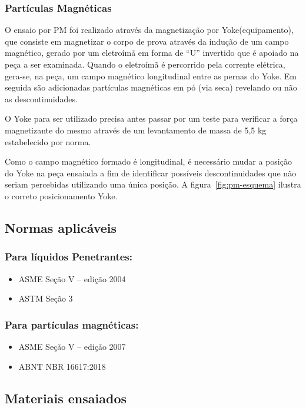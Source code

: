 \documentclass[12pt,oneside]{article}
\begin{document}
\subsubsection{Partículas Magnéticas}
O ensaio por PM foi realizado através da magnetização por Yoke(equipamento), que consiste em magnetizar
o corpo de prova através da indução de um campo magnético, gerado por um eletroímã em forma
de ``U'' invertido que é apoiado na peça a ser examinada. Quando o eletroímã é percorrido
pela corrente elétrica, gera-se, na peça, um campo magnético longitudinal entre as pernas do Yoke.
Em seguida são adicionadas partículas magnéticas em pó (via seca) revelando ou não as descontinuidades.

O Yoke para ser utilizado precisa antes passar por um teste para verificar a força magnetizante do mesmo
através de um levantamento de massa de 5,5 kg estabelecido por norma.

Como o campo magnético formado é longitudinal, é necessário mudar a posição do Yoke na peça
ensaiada a fim de identificar possíveis descontinuidades que não seriam percebidas
utilizando uma única posição. A figura~\ref{fig:pm-esquema} ilustra o correto posicionamento
Yoke.


\subsection{Normas aplicáveis}
\subsubsection{Para líquidos Penetrantes:}

\begin{itemize}
    \item ASME Seção V -- edição 2004
    \item ASTM Seção 3
\end{itemize}

\subsubsection{Para partículas magnéticas:}
\begin{itemize}
    \item ASME Seção V -- edição 2007
    \item ABNT NBR 16617:2018
\end{itemize}

\subsection{Materiais ensaiados}
\end{document}
